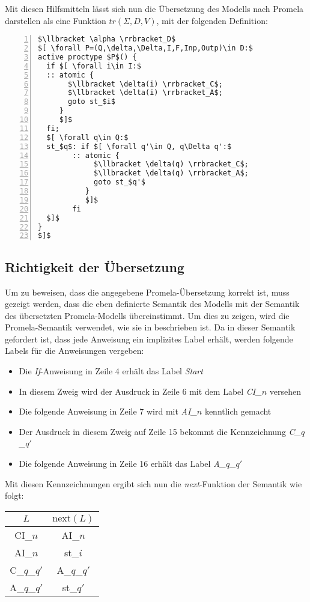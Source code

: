Mit diesen Hilfsmitteln lässt sich nun die Übersetzung des Modells nach Promela darstellen als eine Funktion $tr(\Sigma,D,V)$, mit der folgenden Definition:
\begin{lstlisting}[language=Promela,mathescape=true,numbers=left,numberstyle=\small]
$\llbracket \alpha \rrbracket_D$
$[ \forall P=(Q,\delta,\Delta,I,F,Inp,Outp)\in D:$
active proctype $P$() {
  if $[ \forall i\in I:$
  :: atomic {
       $\llbracket \delta(i) \rrbracket_C$;
       $\llbracket \delta(i) \rrbracket_A$;
       goto st_$i$
     }
     $]$
  fi;
  $[ \forall q\in Q:$
  st_$q$: if $[ \forall q'\in Q, q\Delta q':$
        :: atomic {
             $\llbracket \delta(q) \rrbracket_C$;
             $\llbracket \delta(q) \rrbracket_A$;
             goto st_$q'$
           }
           $]$
        fi
  $]$
}
$]$
\end{lstlisting}
\subsection{Richtigkeit der Übersetzung}
Um zu beweisen, dass die angegebene Promela-Übersetzung korrekt ist, muss gezeigt werden, dass die eben definierte Semantik des Modells mit der Semantik des übersetzten Promela-Modells übereinstimmt.
Um dies zu zeigen, wird die Promela-Semantik verwendet, wie sie in \cite{Gallardo04formalaspects} beschrieben ist.
Da in dieser Semantik gefordert ist, dass jede Anweisung ein implizites Label erhält, werden folgende Labels für die Anweisungen vergeben:
\begin{itemize}
\item Die \emph{If}-Anweisung in Zeile 4 erhält das Label \emph{Start}
\item In diesem Zweig wird der Ausdruck in Zeile 6 mit dem Label \emph{CI\_$n$} versehen
\item Die folgende Anweisung in Zeile 7 wird mit \emph{AI\_$n$} kenntlich gemacht
\item Der Ausdruck in diesem Zweig auf Zeile 15 bekommt die Kennzeichnung \emph{C\_$q$\_$q'$}
\item Die folgende Anweisung in Zeile 16 erhält das Label \emph{A\_$q$\_$q'$}
\end{itemize}

Mit diesen Kennzeichnungen ergibt sich nun die \emph{next}-Funktion der Semantik wie folgt:

\begin{tabular}{|c|c|}
  \hline
  $L$ & $\textrm{next}(L)$\\
  \hline
  CI\_$n$ & AI\_$n$\\
  AI\_$n$ & st\_$i$\\
  C\_$q$\_$q'$ & A\_$q$\_$q'$\\
  A\_$q$\_$q'$ & st\_$q'$\\
  \hline
\end{tabular}

